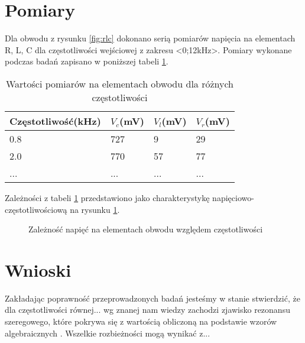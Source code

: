 \documentclass[polish,a4paper]{article}
\begin{document}
\section{Pomiary}
Dla obwodu z rysunku \ref{fig:rlc} dokonano serią pomiarów napięcia na elementach R, L, C dla częstotliwości wejściowej z zakresu <0;12kHz>. Pomiary wykonane podczas badań zapisano w poniższej tabeli \ref{my-label}.

\begin{table}[!h]
\centering
\begin{tabular}{llll}
\hline
Częstotliwość(kHz) & $V_c$(mV) & $V_l$(mV) & $V_r$(mV) \\ \hline
0.8                & 727    & 9      & 29     \\
2.0                & 770    & 57     & 77     \\
...                & ...    & ...    & ...    \\ \hline
\end{tabular}
\caption{Wartości pomiarów na elementach obwodu dla różnych częstotliwości}
\label{my-label}
\end{table}

Zależności z tabeli \ref{my-label} przedstawiono jako charakterystykę napięciowo-częstotliwościową na rysunku \ref{fig:wyk}.
\begin{figure}[!h]
\centering
{}
\caption{Zależność napięć na elementach obwodu względem częstotliwości}
\label{fig:wyk}
\end{figure}

\section{Wnioski}
Zakładając poprawność przeprowadzonych badań jesteśmy w stanie stwierdzić, że dla częstotliwości równej... wg znanej nam wiedzy \cite{bolkowski1986teoria} zachodzi zjawisko rezonansu szeregowego, które pokrywa się z wartością obliczoną na podstawie wzorów algebraicznych \cite{bolkowski1986teoria}. Wszelkie rozbieżności mogą wynikać z...



\end{document}
